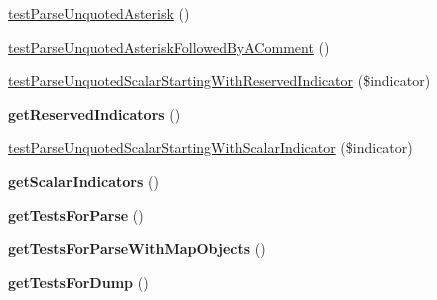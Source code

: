 \begin{DoxyCompactItemize}
\item 
\hyperlink{class_symfony_1_1_component_1_1_yaml_1_1_tests_1_1_inline_test_a654899c8008e663875a1c15d6f4a7631}{test\+Parse\+Unquoted\+Asterisk} ()
\item 
\hyperlink{class_symfony_1_1_component_1_1_yaml_1_1_tests_1_1_inline_test_a80aa0b9d832972aba33b43989abc7e6b}{test\+Parse\+Unquoted\+Asterisk\+Followed\+By\+A\+Comment} ()
\item 
\hyperlink{class_symfony_1_1_component_1_1_yaml_1_1_tests_1_1_inline_test_a1479d85f417e29ca1775e481240c4abf}{test\+Parse\+Unquoted\+Scalar\+Starting\+With\+Reserved\+Indicator} (\$indicator)
\item 
{\bfseries get\+Reserved\+Indicators} ()\hypertarget{class_symfony_1_1_component_1_1_yaml_1_1_tests_1_1_inline_test_a0377540bc3e5ab53a9167585eb7c2a9f}{}\label{class_symfony_1_1_component_1_1_yaml_1_1_tests_1_1_inline_test_a0377540bc3e5ab53a9167585eb7c2a9f}

\item 
\hyperlink{class_symfony_1_1_component_1_1_yaml_1_1_tests_1_1_inline_test_aebef10b48a116c62c26f0d697a63c78d}{test\+Parse\+Unquoted\+Scalar\+Starting\+With\+Scalar\+Indicator} (\$indicator)
\item 
{\bfseries get\+Scalar\+Indicators} ()\hypertarget{class_symfony_1_1_component_1_1_yaml_1_1_tests_1_1_inline_test_a1d7fb21fda16047b3e7feeae4f02acd3}{}\label{class_symfony_1_1_component_1_1_yaml_1_1_tests_1_1_inline_test_a1d7fb21fda16047b3e7feeae4f02acd3}

\item 
{\bfseries get\+Tests\+For\+Parse} ()\hypertarget{class_symfony_1_1_component_1_1_yaml_1_1_tests_1_1_inline_test_a01ae76e09b11e0f1d94563d5b0215f41}{}\label{class_symfony_1_1_component_1_1_yaml_1_1_tests_1_1_inline_test_a01ae76e09b11e0f1d94563d5b0215f41}

\item 
{\bfseries get\+Tests\+For\+Parse\+With\+Map\+Objects} ()\hypertarget{class_symfony_1_1_component_1_1_yaml_1_1_tests_1_1_inline_test_a65333e6c8def574f2dcf2712372094e1}{}\label{class_symfony_1_1_component_1_1_yaml_1_1_tests_1_1_inline_test_a65333e6c8def574f2dcf2712372094e1}

\item 
{\bfseries get\+Tests\+For\+Dump} ()\hypertarget{class_symfony_1_1_component_1_1_yaml_1_1_tests_1_1_inline_test_a5880a2f51da04a8eb3e61d16680634fd}{}\label{class_symfony_1_1_component_1_1_yaml_1_1_tests_1_1_inline_test_a5880a2f51da04a8eb3e61d16680634fd}

\end{DoxyCompactItemize}


